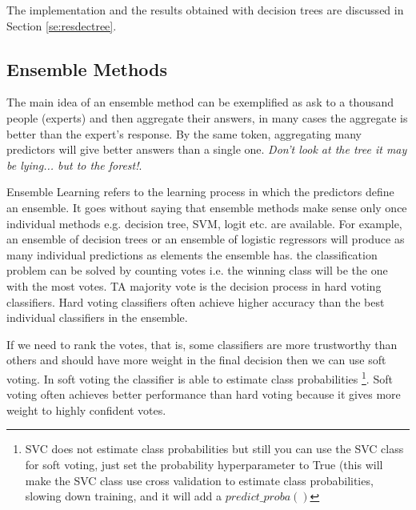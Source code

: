 \documentclass[11pt]{article}
\theoremstyle{definition}
\theoremstyle{remark}
\begin{document}
The implementation and the results obtained with decision trees are discussed in Section \ref{se:resdectree}.

\subsection{Ensemble Methods}
\label{sse:ensemble}
The main idea of an ensemble method can be exemplified as ask to a thousand people (experts) and then aggregate their answers, in many cases the aggregate is better than the expert's response. By the same token, aggregating many predictors will give better answers than a single one. \emph{Don't look at the tree it may be lying... but to the forest!}. 

Ensemble Learning refers to the learning process in which the predictors define an ensemble. It goes without saying that ensemble methods make sense only once individual methods e.g. decision tree, SVM, logit etc. are available. For example, an ensemble of decision trees or an ensemble of logistic regressors will produce as many individual predictions as elements the ensemble has. the classification problem can be solved by counting votes i.e. the winning class will be the one with the most votes. TA majority vote is the decision process in hard voting classifiers. Hard voting classifiers often achieve higher accuracy than the best individual classifiers in the ensemble. 

If we need to rank the votes, that is, some classifiers are more trustworthy than others and should have more weight in the final decision then we can use soft voting. In soft voting the classifier is able to estimate class probabilities \footnote{SVC does not estimate class probabilities but still you can use the SVC class for soft voting, just set the probability hyperparameter to True (this will make the SVC class use cross validation to estimate class probabilities, slowing down training, and it will add a $predict\_proba()$}. Soft voting often achieves better performance than hard voting because it gives more weight to highly confident votes.
\end{document}
